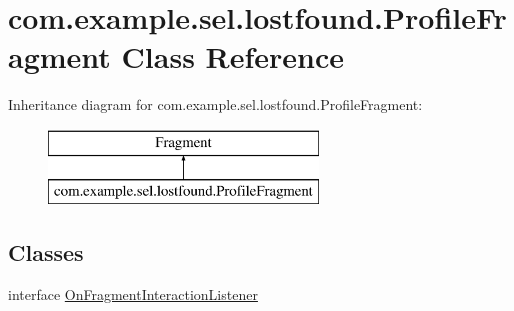 \hypertarget{classcom_1_1example_1_1sel_1_1lostfound_1_1ProfileFragment}{}\section{com.\+example.\+sel.\+lostfound.\+Profile\+Fragment Class Reference}
\label{classcom_1_1example_1_1sel_1_1lostfound_1_1ProfileFragment}
Inheritance diagram for com.\+example.\+sel.\+lostfound.\+Profile\+Fragment\+:\begin{figure}[H]
\begin{center}
\leavevmode
\includegraphics[height=2.000000cm]{classcom_1_1example_1_1sel_1_1lostfound_1_1ProfileFragment}
\end{center}
\end{figure}
\subsection*{Classes}
\begin{DoxyCompactItemize}
\item 
interface \hyperlink{interfacecom_1_1example_1_1sel_1_1lostfound_1_1ProfileFragment_1_1OnFragmentInteractionListener}{On\+Fragment\+Interaction\+Listener}
\end{DoxyCompactItemize}
